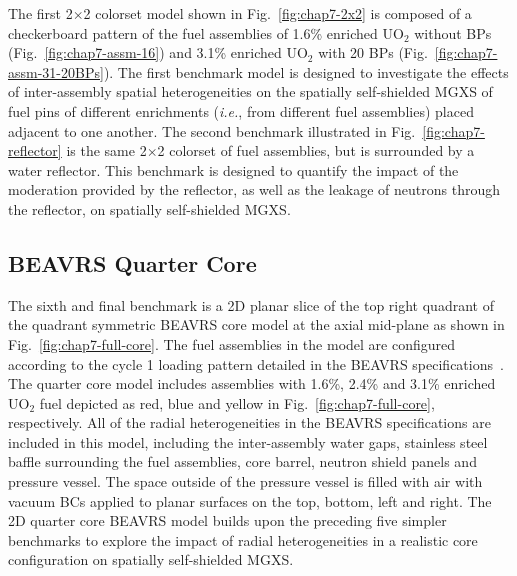 The first 2$\times$2 colorset model shown in Fig.~\ref{fig:chap7-2x2} is composed of a checkerboard pattern of the fuel assemblies of 1.6\% enriched UO$_2$ without \acp{BP} (Fig.~\ref{fig:chap7-assm-16}) and 3.1\% enriched UO$_2$ with 20 \acp{BP} (Fig.~\ref{fig:chap7-assm-31-20BPs}). The first benchmark model is designed to investigate the effects of inter-assembly spatial heterogeneities on the spatially self-shielded \ac{MGXS} of fuel pins of different enrichments (\textit{i.e.}, from different fuel assemblies) placed adjacent to one another. The second benchmark illustrated in Fig.~\ref{fig:chap7-reflector} is the same 2$\times$2 colorset of fuel assemblies, but is surrounded by a water reflector. This benchmark is designed to quantify the impact of the moderation provided by the reflector, as well as the leakage of neutrons through the reflector, on spatially self-shielded \ac{MGXS}.

\subsection{BEAVRS Quarter Core}
\label{subsec:chap7-full-core}

The sixth and final benchmark is a 2D planar slice of the top right quadrant of the quadrant symmetric \ac{BEAVRS} core model at the axial mid-plane as shown in Fig.~\ref{fig:chap7-full-core}. The fuel assemblies in the model are configured according to the cycle 1 loading pattern detailed in the \ac{BEAVRS} specifications~\cite{horelik2013beavrs}. The quarter core model includes assemblies with 1.6\%, 2.4\% and 3.1\% enriched UO$_2$ fuel depicted as red, blue and yellow in Fig.~\ref{fig:chap7-full-core}, respectively. All of the radial heterogeneities in the \ac{BEAVRS} specifications are included in this model, including the inter-assembly water gaps, stainless steel baffle surrounding the fuel assemblies, core barrel, neutron shield panels and pressure vessel. The space outside of the pressure vessel is filled with air with vacuum \acp{BC} applied to planar surfaces on the top, bottom, left and right. The 2D quarter core \ac{BEAVRS} model builds upon the preceding five simpler benchmarks to explore the impact of radial heterogeneities in a realistic core configuration on spatially self-shielded \ac{MGXS}.

